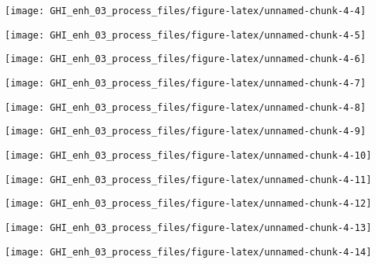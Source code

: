 \documentclass[
  10pt,
  a4paper,oneside]{article}
\begin{document}
\begin{center}\texttt{[image: GHI\_enh\_03\_process\_files/figure-latex/unnamed-chunk-4-4]} \end{center}

\begin{center}\texttt{[image: GHI\_enh\_03\_process\_files/figure-latex/unnamed-chunk-4-5]} \end{center}

\begin{center}\texttt{[image: GHI\_enh\_03\_process\_files/figure-latex/unnamed-chunk-4-6]} \end{center}

\begin{center}\texttt{[image: GHI\_enh\_03\_process\_files/figure-latex/unnamed-chunk-4-7]} \end{center}

\begin{center}\texttt{[image: GHI\_enh\_03\_process\_files/figure-latex/unnamed-chunk-4-8]} \end{center}

\begin{center}\texttt{[image: GHI\_enh\_03\_process\_files/figure-latex/unnamed-chunk-4-9]} \end{center}

\begin{center}\texttt{[image: GHI\_enh\_03\_process\_files/figure-latex/unnamed-chunk-4-10]} \end{center}

\begin{center}\texttt{[image: GHI\_enh\_03\_process\_files/figure-latex/unnamed-chunk-4-11]} \end{center}

\begin{center}\texttt{[image: GHI\_enh\_03\_process\_files/figure-latex/unnamed-chunk-4-12]} \end{center}

\begin{center}\texttt{[image: GHI\_enh\_03\_process\_files/figure-latex/unnamed-chunk-4-13]} \end{center}

\begin{center}\texttt{[image: GHI\_enh\_03\_process\_files/figure-latex/unnamed-chunk-4-14]} \end{center}
\end{document}
